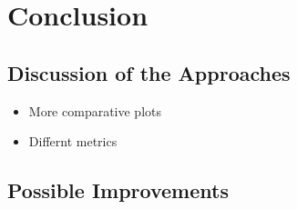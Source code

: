 \chapter{Conclusion}
\section{Discussion of the Approaches}
\begin{itemize}
    \item More comparative plots
    \item Differnt metrics
\end{itemize}
\section{Possible Improvements}
